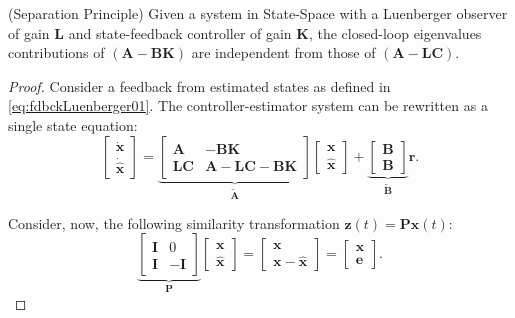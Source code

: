 \documentclass[a4paper,11pt]{book}
\numberwithin{figure}{chapter}
\numberwithin{equation}{chapter}
\numberwithin{table}{chapter}
\newtheorem{theorem}{Theorem}[chapter]
\theoremstyle{definition}
\newcounter{boxed-theorem}
\newenvironment{boxed-theorem}[1]
{\colorlet{shadecolor}{pastelBlue2!5} \begin{shaded} \begin{theorem}{#1}}
{\end{theorem} \end{shaded}}
\newcounter{boxed-lemma}
\newcounter{boxed-definition}
\newcounter{boxed-example}
\begin{document}
\begin{boxed-theorem}{(Separation Principle)} \label{th:separationPrinciple}
    Given a system in State-Space with a Luenberger observer of gain $\bm{L}$ and state-feedback controller of gain $\bm{K}$, the closed-loop eigenvalues contributions of $(\bm{A} - \bm{B}\bm{K})$ are independent from those of $(\bm{A} - \bm{L}\bm{C})$.
\end{boxed-theorem}

\begin{proof}
    Consider a feedback from estimated states as defined in \eqref{eq:fdbckLuenberger01}. The controller-estimator system can be rewritten as a single state equation:
    \begin{equation}
    \begin{bmatrix} \dot{\bm{x}} \\ \dot{\hat{\bm{x}}}  \end{bmatrix}
    =
    \underbrace{\begin{bmatrix}
        \bm{A} & - \bm{B} \bm{K} \\
        \bm{L} \bm{C} & \bm{A} - \bm{L} \bm{C} - \bm{B} \bm{K}
    \end{bmatrix}}_{\tilde{\bm{A}}} \begin{bmatrix} \bm{x} \\ \hat{\bm{x}} \end{bmatrix}
    +
    \underbrace{\begin{bmatrix} \bm{B} \\ \bm{B} \end{bmatrix}}_{\tilde{\bm{B}}} \bm{r}
.\end{equation} 

Consider, now, the following similarity transformation $\bm{z}(t) = \bm{P} \bm{x}(t)$:
\begin{equation}
    \underbrace{\begin{bmatrix}
        \bm{I} & 0 \\ \bm{I} & -\bm{I}
    \end{bmatrix}}_{\bm{P}} \begin{bmatrix}
        \bm{x} \\ \hat{\bm{x}}
    \end{bmatrix} = \begin{bmatrix}
        \bm{x} \\ \bm{x} - \hat{\bm{x}}
    \end{bmatrix} = \begin{bmatrix}
        \bm{x} \\ \bm{e}
    \end{bmatrix} 
.\end{equation}


\end{proof}
\end{document}
